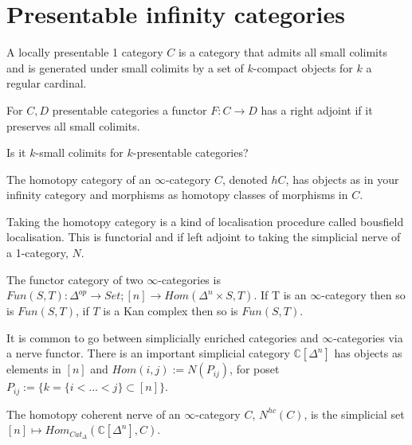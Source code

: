 \section{Presentable infinity categories}
\begin{definition}
    A locally presentable 1 category $C$ is a category that admits all small colimits and is generated under small colimits by a set of $k$-compact objects for $k$ a regular cardinal.
\end{definition}

\begin{proposition}
For $C, D$ presentable categories a functor $F: C \to D$ has a right adjoint if it preserves all small colimits.
\end{proposition}

\begin{question}
    Is it $k$-small colimits for $k$-presentable categories?
\end{question}

\begin{definition}
    The homotopy category of an $\infty$-category $C$, denoted $hC$, has objects as in your infinity category and morphisms as homotopy classes of morphisms in $C$.
\end{definition}
\begin{remark}
    Taking the homotopy category is a kind of localisation procedure called bousfield localisation. This is functorial and if left adjoint to taking the simplicial nerve of a 1-category, $N$.
\end{remark}

\begin{definition}
    The functor category of two $\infty$-categories is $Fun(S, T):\Delta^{op} \to Set; [n] \to Hom(\Delta^n\times S, T)$.
    If T is an $\infty$-category then so is $Fun(S, T)$, if $T$ is a Kan complex then so is $Fun(S, T)$.
\end{definition}

It is common to go between simplicially enriched categories and $\infty$-categories via a nerve functor. There is an important simplicial category $\mathbb{C}[\Delta^n]$ has objects as elements in $[n]$ and $Hom(i, j):=N(P_{ij})$, for poset $P_{ij}:=\{ k=\{i< ...<j\}\subset{[n]}\}$.

\begin{definition}
    The homotopy coherent nerve of an $\infty$-category $C$, $N^{hc}(C)$, is the simplicial set $[n] \mapsto Hom_{Cat_\Delta}(\mathbb{C}[\Delta^n], C)$. 
\end{definition}

